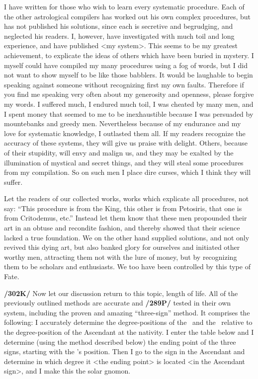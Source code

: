 I have written for those who wish to learn every systematic procedure. Each of the other astrological compilers has worked out his own complex procedures, but has not published his solutions, since each is
secretive and begrudging, and neglected his readers. I, however, have investigated with much toil and long experience, and have published <my system>. This seems to be my greatest achievement, to explicate the ideas of others which have been buried in mystery. I myself could have compiled my many procedures using a fog of words, but I did not want to show myself to be like those babblers. It would be laughable to begin speaking against someone without recognizing first my own faults. Therefore if you find me speaking very often about my generosity and openness, please forgive my words. I suffered much, I
endured much toil, I was cheated by many men, and I spent money that seemed to me to be inexhaustible because I was persuaded by mountebanks and greedy men. Nevertheless because of my endurance and my love for systematic knowledge, I outlasted them all. If my readers recognize the accuracy of these systems, they will give us praise with delight. Others, because of their stupidity, will envy and malign us, and they may be exalted by the illumination of mystical and secret things, and they will steal some procedures from my compilation. So on such men I place dire curses, which I think they will suffer.

Let the readers of our collected works, works which explicate all procedures, not say: “This procedure is from the King, this other is from Petosiris, that one is from Critodemus, etc.” Instead let them know
that these men propounded their art in an obtuse and recondite fashion, and thereby showed that their science lacked a true foundation. We on the other hand supplied solutions, and not only revived this dying art, but also banked glory for ourselves and initiated other worthy men, attracting them not with the lure of money, but by recognizing them to be scholars and enthusiasts. We too have been controlled by this type of Fate.

\textbf{/302K/} Now let our discussion return to this topic, length of life. All of the previously outlined methods are accurate and \textbf{/289P/} tested in their own system, including the proven and amazing “three-sign” method. It comprises the following: I accurately determine the degree-positions of the \Sun\, and the \Moon\, relative to the degree-position of the Ascendant at the nativity. I enter the table below and I determine (using the method described below) the ending point of the three signs, starting with the \Sun’s position. Then I go to the sign in the Ascendant and determine in which degree it <the ending point> is located <in the Ascendant sign>, and I make this the solar gnomon.

